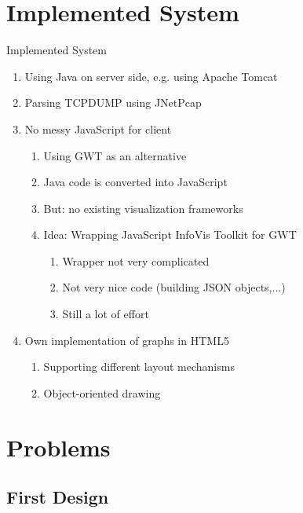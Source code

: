 \documentclass{beamer}
\begin{document}
\section{Implemented System}

\begin{frame}{Implemented System}
 \begin{enumerate}
  \item Using Java on server side, e.g. using Apache Tomcat
  \item Parsing TCPDUMP using JNetPcap
  \item No messy JavaScript for client
  \begin{enumerate}
    \item Using GWT as an alternative
    \item Java code is converted into JavaScript
    \item But: no existing visualization frameworks
    \item Idea: Wrapping JavaScript InfoVis Toolkit for GWT
    \begin{enumerate}
      \item Wrapper not very complicated
      \item Not very nice code (building JSON objects,...)
      \item Still a lot of effort
    \end{enumerate}
  \end{enumerate}
  \item Own implementation of graphs in HTML5
        \begin{enumerate}
	  \item Supporting different layout mechanisms
	  \item Object-oriented drawing
	\end{enumerate}
 \end{enumerate}
\end{frame}


\section{Problems}

\subsection{First Design}
\end{document}
